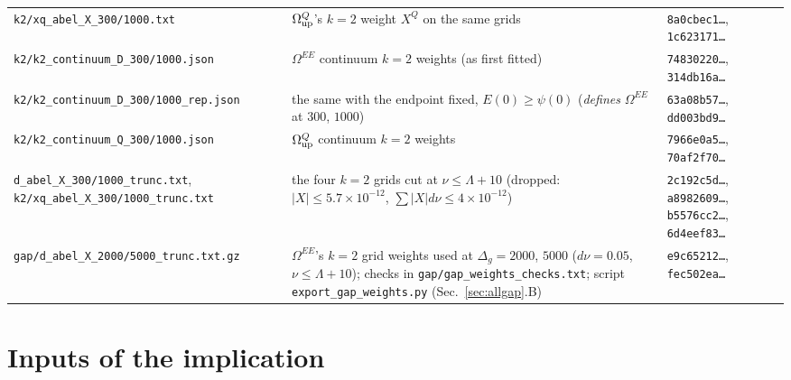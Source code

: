 \documentclass[aps,prl,onecolumn,superscriptaddress,nofootinbib]{revtex4-2}
\begin{document}
\begin{table}[!htbp]
\begin{ruledtabular}
\begin{tabular}{L{4.4cm}L{8.4cm}L{3.2cm}}
\texttt{k2/xq\_abel\_X\_}\allowbreak\texttt{300/1000.txt} & $\Omega^Q_{\rm up}$'s $k=2$ weight $X^Q$ on the same grids & \texttt{8a0cbec1\dots}, \texttt{1c623171\dots}\\
\texttt{k2/k2\_continuum\_}\allowbreak\texttt{D\_300/1000.json} & $\Omega^{EE}$ continuum $k=2$ weights (as first fitted) & \texttt{74830220\dots}, \texttt{314db16a\dots}\\
\texttt{k2/k2\_continuum\_}\allowbreak\texttt{D\_300/1000\_rep.json} & the same with the endpoint fixed, $E(0)\ge\psi(0)$ (\emph{defines} $\Omega^{EE}$ at $300$, $1000$) & \texttt{63a08b57\dots}, \texttt{dd003bd9\dots}\\
\texttt{k2/k2\_continuum\_}\allowbreak\texttt{Q\_300/1000.json} & $\Omega^Q_{\rm up}$ continuum $k=2$ weights & \texttt{7966e0a5\dots}, \texttt{70af2f70\dots}\\
\texttt{d\_abel\_X\_300/1000\_trunc.txt}, \texttt{k2/xq\_abel\_X\_}\allowbreak\texttt{300/1000\_trunc.txt} & the four $k=2$ grids cut at $\nu\le\Lambda+10$ (dropped: $|X|\le5.7\times10^{-12}$, $\sum|X|d\nu\le4\times10^{-12}$) & \texttt{2c192c5d\dots}, \texttt{a8982609\dots}, \texttt{b5576cc2\dots}, \texttt{6d4eef83\dots}\\
\texttt{gap/d\_abel\_X\_}\allowbreak\texttt{2000/5000\_trunc.txt.gz} & $\Omega^{EE}$'s $k=2$ grid weights used at $\Delta_g=2000$, $5000$ ($d\nu=0.05$, $\nu\le\Lambda+10$); checks in \texttt{gap/gap\_weights\_checks.txt}; script \texttt{export\_gap\_weights.py} (Sec.~\ref{sec:allgap}.B) & \texttt{e9c65212\dots}, \texttt{fec502ea\dots}\\
\end{tabular}
\end{ruledtabular}
\end{table}

\section{Inputs of the implication}
\label{sec:inputs}
\end{document}
